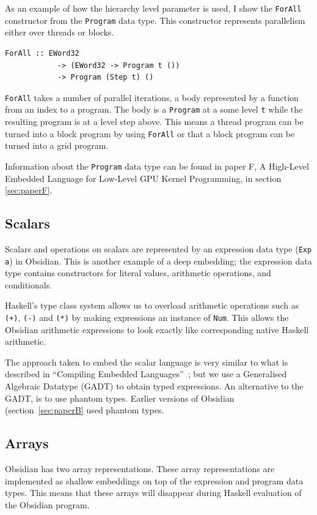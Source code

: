 \documentclass[a4paper]{book}
\newcommand{\paperFTitle}{A High-Level Embedded Language for Low-Level GPU Kernel Programming}
\begin{document}
As an example of how the hierarchy level parameter is used, I show the {\tt ForAll} constructor 
from the {\tt Program} data type.  This constructor represents parallelism either over threads 
or blocks. 

\begin{verbatim}
ForAll :: EWord32 
            -> (EWord32 -> Program t ())
            -> Program (Step t) ()
\end{verbatim}

{\tt ForAll} takes a number of parallel iterations, a body represented by a function 
from an index to a program. The body is a {\tt Program} at a some level {\tt t} while the 
resulting program is at a level step above. This means a thread program can be turned into 
a block program by using {\tt ForAll} or that a block program can be turned into a grid program. 

Information about the {\tt Program} data type can be found in paper F, \paperFTitle, in 
section \ref{sec:paperF}. 

\subsection{Scalars} 

Scalars and operations on scalars are represented by an expression data type ({\tt Exp a}) in 
Obsidian. This is another example of a deep embedding; the expression data type contains 
constructors for literal values, arithmetic operations, and conditionals. 

Haskell's type class system allows us to overload arithmetic operations such as {\tt (+)}, 
{\tt (-)} and {\tt (*)} by making expressions an instance of {\tt Num}. This allows the 
Obsidian arithmetic expressions to look exactly like corresponding native Haskell arithmetic. 

The approach taken to embed the scalar language is very similar to what is described 
in ``Compiling Embedded Languages''~\citet{COMPILEEDSL}; but we use a Generalised Algebraic 
Datatype (GADT) to obtain typed expressions. An alternative to the GADT, is to use phantom 
types. Earlier versions of Obsidian (section~\ref{sec:paperB} used phantom types. 


\subsection{Arrays} 

Obsidian has two array representations. These array representations are implemented as 
shallow embeddings on top of the expression and program data types. This means that these 
arrays will disappear during Haskell evaluation of the Obsidian program.
 
\end{document}
